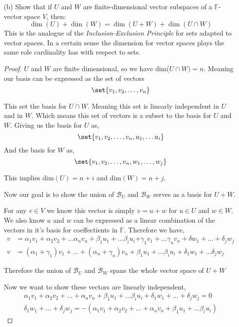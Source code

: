 \documentclass[12pt]{article}
\DeclarePairedDelimiter\set\{\}
\newcommand      {\Fm}         {{\mathbb F}}
\begin{document}
\begin{itemize}
\begin{itemize}
    \vspace{.3cm}
    \item[(b)]
    Show that if $U$ and $W$ are finite-dimensional vector subspaces of a $\mathbb{F}$-vector space $V$, then:
    \begin{equation*}
    \dim(U) + \dim(W) = \dim(U + W) + \dim(U \cap W)
    \end{equation*}
    This is the analogue of the \textit{Inclusion-Exclusion Principle} for sets adapted to vector spaces. In a certain sense the dimension for vector spaces plays the same role cardinality has with respect to sets. 

    \begin{proof}
        $U$ and $W$ are finite dimensional, so we have dim($U\cap W) = n$. Meaning our basis can be expressed as the set of vectors
        \[\set{v_1, v_2,\dots, v_n}\]

        This set the basis for $U\cap W$. Meaning this set is linearly independent in $U$ and in $W$. Which means this set of vectors is a subset to the basis for $U$ and $W$. Giving us the basis for $U$ as,
        \[\set{v_1, v_2, \dots, v_n, u_1, \dots u_i}\]
        And the basis for $W$ as,
        \[\set{v_1,v_2,\dots, v_n, w_1,\dots, w_j}\]

        This implies dim$(U) = n + i$ and dim$(W) = n + j$. 

        Now our goal is to show the union of $\mathcal{B}_U$ and $\mathcal{B}_W$ serves as a basis for $U + W$. 

        For any $v\in V$ we know this vector is simply $v = u + w$ for $u\in U$ and $w\in W$. We also know $u$ and $w$ can be expressed as a linear combination of the vectors in it's basis for coeffectients in $\Fm$. Therefore we have,
        \begin{align*}
            v &= \alpha_1v_1 + \alpha_2v_2 + \dots \alpha_nv_n + \beta_1u_1 + \dots \beta_iu_i \textbf{+} \gamma_1v_1+\dots \gamma_nv_n + \delta w_1 + \dots +\delta_j w_j \\
            v &= (\alpha_1 + \gamma_1)v_1 + \dots + (\alpha_n + \gamma_n)v_n + \beta_1u_1 + \dots \beta_iu_i + \delta_1w_1 + \dots \delta_jw_j
        \end{align*}

        Therefore the union of $\mathcal{B}_U$ and $\mathcal{B}_W$ spans the whole vector space of $U+W$

        Now we want to show these vectors are linearly independent,
        \begin{align*}
            \alpha_1v_1+ \alpha_2v_2+ \dots+ \alpha_nv_n+ \beta_1u_1+ \dots\beta_i u_i +  \delta_1w_1+\dots+ \delta_jw_j = 0 \\
            \delta_1w_1+\dots+ \delta_jw_j = -(\alpha_1v_1 + \alpha_2v_2+ \dots+ \alpha_nv_n+ \beta_1u_1+ \dots\beta_i u_i)
        \end{align*}


\end{proof}
\end{itemize}
\end{itemize}
\end{document}
